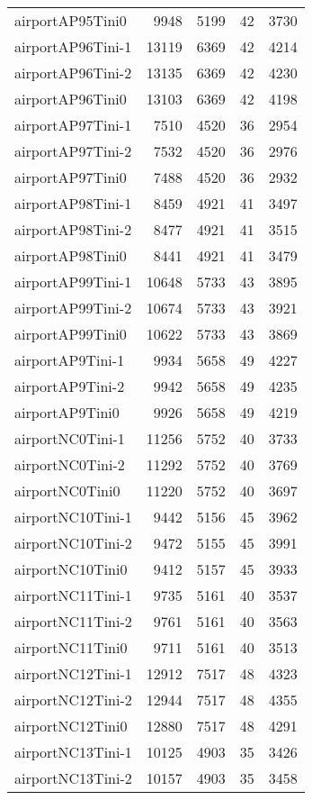 \documentclass[../../../thesis.tex]{subfiles}
\begin{document}
\begin{longtable}{lrrrr}
airportAP95Tini0 & 9948 & 5199 & 42 & 3730 \\
airportAP96Tini-1 & 13119 & 6369 & 42 & 4214 \\
airportAP96Tini-2 & 13135 & 6369 & 42 & 4230 \\
airportAP96Tini0 & 13103 & 6369 & 42 & 4198 \\
airportAP97Tini-1 & 7510 & 4520 & 36 & 2954 \\
airportAP97Tini-2 & 7532 & 4520 & 36 & 2976 \\
airportAP97Tini0 & 7488 & 4520 & 36 & 2932 \\
airportAP98Tini-1 & 8459 & 4921 & 41 & 3497 \\
airportAP98Tini-2 & 8477 & 4921 & 41 & 3515 \\
airportAP98Tini0 & 8441 & 4921 & 41 & 3479 \\
airportAP99Tini-1 & 10648 & 5733 & 43 & 3895 \\
airportAP99Tini-2 & 10674 & 5733 & 43 & 3921 \\
airportAP99Tini0 & 10622 & 5733 & 43 & 3869 \\
airportAP9Tini-1 & 9934 & 5658 & 49 & 4227 \\
airportAP9Tini-2 & 9942 & 5658 & 49 & 4235 \\
airportAP9Tini0 & 9926 & 5658 & 49 & 4219 \\
airportNC0Tini-1 & 11256 & 5752 & 40 & 3733 \\
airportNC0Tini-2 & 11292 & 5752 & 40 & 3769 \\
airportNC0Tini0 & 11220 & 5752 & 40 & 3697 \\
airportNC10Tini-1 & 9442 & 5156 & 45 & 3962 \\
airportNC10Tini-2 & 9472 & 5155 & 45 & 3991 \\
airportNC10Tini0 & 9412 & 5157 & 45 & 3933 \\
airportNC11Tini-1 & 9735 & 5161 & 40 & 3537 \\
airportNC11Tini-2 & 9761 & 5161 & 40 & 3563 \\
airportNC11Tini0 & 9711 & 5161 & 40 & 3513 \\
airportNC12Tini-1 & 12912 & 7517 & 48 & 4323 \\
airportNC12Tini-2 & 12944 & 7517 & 48 & 4355 \\
airportNC12Tini0 & 12880 & 7517 & 48 & 4291 \\
airportNC13Tini-1 & 10125 & 4903 & 35 & 3426 \\
airportNC13Tini-2 & 10157 & 4903 & 35 & 3458 \\

\end{longtable}
\end{document}
